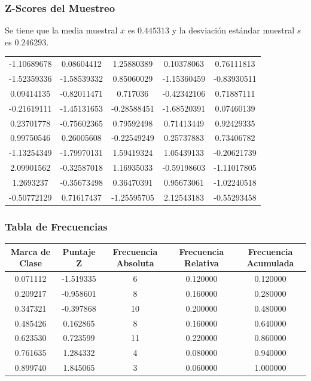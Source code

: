 \documentclass[12pt,a4paper]{article}
\begin{document}
    \subsubsection{Z-Scores del Muestreo}
        Se tiene que la media muestral $\overline{x}$ es $0.445313$ y la 
        desviación estándar muestral $s$ es $0.246293$.
        \begin{center}
            \begin{tabular}{ccccc}
                -1.10689678 &  0.08604412 &  1.25880389 &  0.10378063 &  0.76111813 \\
                -1.52359336 & -1.58539332 &  0.85060029 & -1.15360459 & -0.83930511 \\
                 0.09414135 & -0.82011471 &  0.717036   & -0.42342106 &  0.71887111 \\
                -0.21619111 & -1.45131653 & -0.28588451 & -1.68520391 &  0.07460139 \\
                 0.23701778 & -0.75602365 &  0.79592498 &  0.71413449 &  0.92429335 \\
                 0.99750546 &  0.26005608 & -0.22549249 &  0.25737883 &  0.73406782 \\
                -1.13254349 & -1.79970131 &  1.59419324 &  1.05439133 & -0.20621739 \\
                 2.09901562 & -0.32587018 &  1.16935033 & -0.59198603 & -1.11017805 \\
                 1.2693237  & -0.35673498 &  0.36470391 &  0.95673061 & -1.02240518 \\
                -0.50772129 &  0.71617437 & -1.25595705 &  2.12543183 & -0.55293458 \\
            \end{tabular}
        \end{center}

    \subsubsection{Tabla de Frecuencias}
        \begin{center}
            \begin{tabular}{|c|c|c|c|c|}
                \hline
                Marca de Clase & Puntaje Z & Frecuencia Absoluta & Frecuencia Relativa & Frecuencia Acumulada \\
                \hline
                0.071112 & -1.519335 & 6  & 0.120000 & 0.120000 \\
                0.209217 & -0.958601 & 8  & 0.160000 & 0.280000 \\
                0.347321 & -0.397868 & 10 & 0.200000 & 0.480000 \\
                0.485426 &  0.162865 & 8  & 0.160000 & 0.640000 \\
                0.623530 &  0.723599 & 11 & 0.220000 & 0.860000 \\
                0.761635 &  1.284332 & 4  & 0.080000 & 0.940000 \\
                0.899740 &  1.845065 & 3  & 0.060000 & 1.000000 \\
                \hline
            \end{tabular}
        \end{center} 
\end{document}
